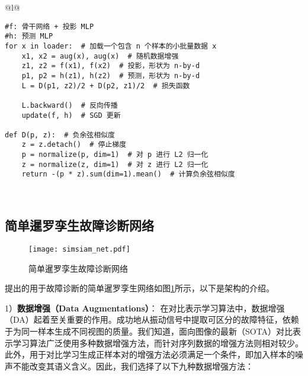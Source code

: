\documentclass[master]{thesis-uestc}
\begin{document}
\begin{table}
    \caption{简单暹罗孪生网络的伪代码，用Pytorch描述}
    \begin{tabular}{@{}l@{}} %
    \toprule
     \\ %
    \midrule
    \begin{lstlisting}[basicstyle=\ttfamily,frame=none]
#f: 骨干网络 + 投影 MLP
#h: 预测 MLP
for x in loader:  # 加载一个包含 n 个样本的小批量数据 x
    x1, x2 = aug(x), aug(x)  # 随机数据增强
    z1, z2 = f(x1), f(x2)  # 投影，形状为 n-by-d
    p1, p2 = h(z1), h(z2)  # 预测，形状为 n-by-d
    L = D(p1, z2)/2 + D(p2, z1)/2  # 损失函数

    L.backward()  # 反向传播
    update(f, h)  # SGD 更新

def D(p, z):  # 负余弦相似度
    z = z.detach()  # 停止梯度
    p = normalize(p, dim=1)  # 对 p 进行 L2 归一化
    z = normalize(z, dim=1)  # 对 z 进行 L2 归一化
    return -(p * z).sum(dim=1).mean()  # 计算负余弦相似度
    \end{lstlisting} \\
    \bottomrule
    \end{tabular}
    \label{table:simsiam_code}
\end{table}
\subsection{简单暹罗孪生故障诊断网络}
\begin{figure}[h]
    \centering
    \texttt{[image: simsiam\_net.pdf]}
    \caption{简单暹罗孪生故障诊断网络}
    \label{simsiam_net}
\end{figure}
提出的用于故障诊断的简单暹罗孪生网络如图\ref{simsiam_net}所示，以下是架构的介绍。

1）\textbf{数据增强（Data Augmentations）}：
在对比表示学习算法中，数据增强（DA）起着至关重要的作用。成功地从振动信号中提取可区分的故障特征，依赖于为同一样本生成不同视图的质量。我们知道，面向图像的最新（SOTA）对比表示学习算法广泛使用多种数据增强方法，而针对序列数据的增强方法则相对较少。
此外，用于对比学习生成正样本对的增强方法必须满足一个条件，即加入样本的噪声不能改变其语义含义。因此，我们选择了以下九种数据增强方法：
\end{document}
